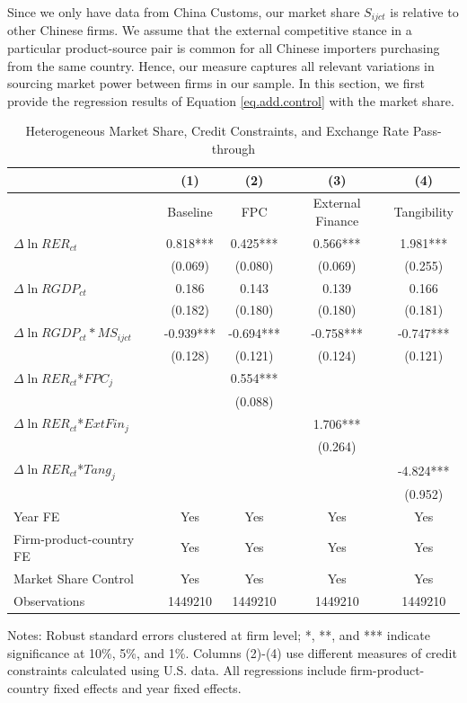 \documentclass[12pt]{article}
\begin{document}
Since we only have data from China Customs, our market share $S_{ijct}$ is relative to other Chinese firms. We assume that the external competitive stance in a particular product-source pair is common for all Chinese importers purchasing from the same country. Hence, our measure captures all relevant variations in sourcing market power between firms in our sample. In this section, we first provide the regression results of Equation \ref{eq.add.control} with the market share. 

\begin{table}[htbp]
	\centering
	\caption{Heterogeneous Market Share, Credit Constraints, and Exchange Rate Pass-through}
	\begin{threeparttable}
		\begin{tabular}{lcccc}
			\toprule
			& (1)   & (2)   & (3)   & (4) \\
			\midrule
			&  Baseline     & FPC & External Finance& Tangibility        \\
			\midrule
			$\Delta \ln RER_{ct}$ & 0.818*** & 0.425*** & 0.566*** & 1.981*** \\
			& (0.069) & (0.080) & (0.069) & (0.255) \\
			$\Delta \ln RGDP_{ct}$ & 0.186 & 0.143 & 0.139 & 0.166 \\
			& (0.182) & (0.180) & (0.180) & (0.181) \\
			$\Delta \ln RGDP_{ct}*MS_{ijct}$ & -0.939*** & -0.694*** & -0.758*** & -0.747*** \\
			& (0.128) & (0.121) & (0.124) & (0.121) \\
			$\Delta \ln RER_{ct}$*$FPC_{j}$ &  & 0.554*** &       &  \\
			&    & (0.088) &       &  \\
			$\Delta \ln RER_{ct}$*$ExtFin_{j}$ &   &       & 1.706*** &  \\
			&    &       & (0.264) &  \\
			$\Delta \ln RER_{ct}$*$Tang_{j}$ &   &       &       & -4.824*** \\
			&   &       &       & (0.952) \\
			Year FE  & Yes  & Yes   & Yes   & Yes \\
			Firm-product-country FE & Yes    & Yes   & Yes   & Yes \\
			Market Share Control & Yes   & Yes   & Yes   & Yes \\
			Observations & 1449210  & 1449210 & 1449210 & 1449210 \\
			\bottomrule
		\end{tabular}
		\begin{tablenotes}
			\footnotesize
			\item[Notes:] Robust standard errors clustered at firm level; *, **, and *** indicate significance at 10\%, 5\%, and 1\%. Columns (2)-(4) use different measures of credit constraints calculated using U.S. data. All regressions include firm-product-country fixed effects and year fixed effects.
		\end{tablenotes}
	\end{threeparttable}
	\label{tab.share}
\end{table}
\end{document}
